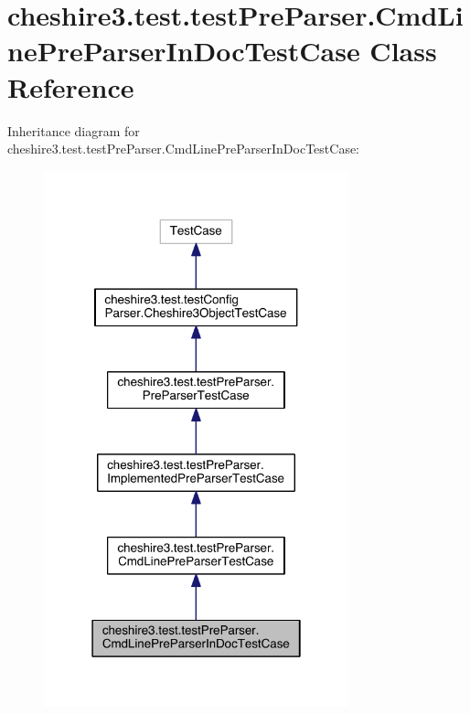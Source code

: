 \hypertarget{classcheshire3_1_1test_1_1test_pre_parser_1_1_cmd_line_pre_parser_in_doc_test_case}{\section{cheshire3.\-test.\-test\-Pre\-Parser.\-Cmd\-Line\-Pre\-Parser\-In\-Doc\-Test\-Case Class Reference}
\label{classcheshire3_1_1test_1_1test_pre_parser_1_1_cmd_line_pre_parser_in_doc_test_case}
}


Inheritance diagram for cheshire3.\-test.\-test\-Pre\-Parser.\-Cmd\-Line\-Pre\-Parser\-In\-Doc\-Test\-Case\-:
\nopagebreak
\begin{figure}[H]
\begin{center}
\leavevmode
\includegraphics[width=250pt]{classcheshire3_1_1test_1_1test_pre_parser_1_1_cmd_line_pre_parser_in_doc_test_case__inherit__graph}
\end{center}
\end{figure}


